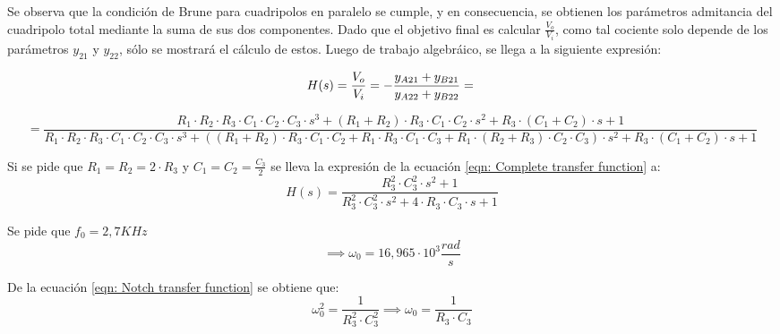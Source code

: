 Se observa que la condici\'on de Brune para cuadripolos en paralelo se cumple, y en consecuencia, se obtienen los par\'ametros admitancia del cuadripolo total mediante la suma de sus dos componentes.
Dado que el objetivo final es calcular $\frac{V_o}{V_i}$, como tal cociente solo depende de los par\'ametros $y_{21}$ y $y_{22}$, s\'olo se mostrar\'a el c\'alculo de estos.
Luego de trabajo algebr\'aico, se llega a la siguiente expresi\'on:

\begin{equation}
    H(s) = \frac{V_o}{V_i} = -\frac{y_{A21} + y_{B21}}{y_{A22} + y_{B22}} = \\
\end{equation}

\begin{equation} 
    \label{eqn: Complete transfer function}
    = \frac{R_1 \cdot R_2 \cdot R_3 \cdot C_1 \cdot C_2 \cdot C_3 \cdot s^3 + \left(R_1 + R_2\right) \cdot R_3 \cdot C_1 \cdot C_2 \cdot s^2 + R_3 \cdot \left(C_1 +C_2\right) \cdot s + 1}
    {R_1 \cdot R_2 \cdot R_3 \cdot C_1 \cdot C_2 \cdot C_3 \cdot s^3 + \left(\left(R_1 + R_2\right) \cdot R_3 \cdot C_1 \cdot C_2 + R_1 \cdot R_3 \cdot C_1 \cdot C_3 + R_1 \cdot \left(R_2 + R_3\right) \cdot C_2 \cdot C_3\right) \cdot s^2 + R_3 \cdot \left(C_1 +C_2\right) \cdot s + 1}
\end{equation}

Si se pide que $R_1 = R_2 = 2 \cdot R_3$ y $C_1 = C_2 = \frac{C_3}{2}$ se lleva la expresi\'on de la ecuaci\'on \ref{eqn: Complete transfer function} a:
\begin{equation} 
    \label{eqn: Notch transfer function}
    H(s) = \frac{R_3^2 \cdot C_3^2 \cdot s^2 + 1}{R_3^2 \cdot C_3^2 \cdot s^2 + 4 \cdot R_3 \cdot C_3 \cdot s + 1}
\end{equation}

Se pide que $f_0 = 2,7 KHz$
\begin{equation}
    \implies \omega_0 =  16,965 \cdot 10^3 \frac{rad}{s}
\end{equation}

De la ecuaci\'on \ref{eqn: Notch transfer function} se obtiene que:
\begin{equation}
    \omega_0^2 = \frac{1}{R_3^2 \cdot C_3^2} \implies \omega_0 = \frac{1}{R_3 \cdot C_3}
\end{equation}

